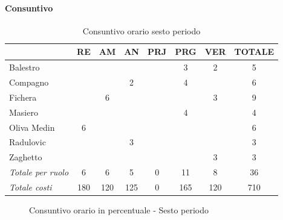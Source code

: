 \documentclass[a4paper,12pt]{article}
\begin{document}
            \paragraph{Consuntivo}
                \begin{table}[H]
                \centering
                \caption{Consuntivo orario sesto periodo}
                \begin{tabular}{|l|c|c|c|c|c|c|c|}
                \hline
                    \rowcolor{lightgray}{\textbf{Membro}} & {\textbf{RE}} & {\textbf{AM}} & {\textbf{AN}} & {\textbf{PRJ}} & {\textbf{PRG}} & {\textbf{VER}} & {\textbf{TOTALE}}\\
                \hline
                    Balestro & & & & & 3 & 2 & 5\\
                \hline
                    Compagno & & & 2 & & 4 & & 6\\
                \hline
                    Fichera & & 6 & & & & 3 & 9\\
                \hline
                    Masiero & & & & & 4 & & 4\\
                \hline
                    Oliva Medin & 6 & & & & & & 6\\
                \hline
                    Radulovic & & & 3 & & & & 3\\
                \hline
                    Zaghetto & & & & & & 3 & 3\\
                \hline
                    \rowcolor{lightgray}\textit{Totale per ruolo} & 6 & 6 & 5 & 0 & 11 & 8 & 36\\
                \hline
                    \rowcolor{lightgray}\textit{Totale costi} & 180 & 120 & 125 & 0 & 165 & 120 & 710\\
                \hline
                \end{tabular}
                \end{table}

                \begin{figure}[H]
                \centering
                \caption{Consuntivo orario in percentuale - Sesto periodo}
                \end{figure}
                
\end{document}
